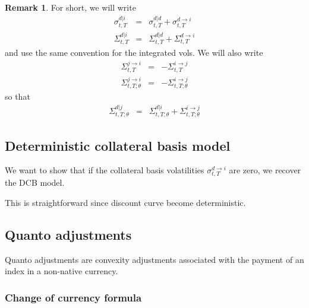 \documentclass[11pt,english]{amsart}
\theoremstyle{definition}
\newtheorem{rema}{Remark}
\begin{document}
\begin{rema}
For short, we will  write 
\begin{eqnarray}
  \sigma^{d|i}_{t,T} &=& \sigma^{d|d}_{t,T}  + \sigma^{d\to i}_{t,T} \\
  \Sigma^{d|i}_{t,T} &=& \Sigma^{d|d}_{t,T}  + \Sigma^{d\to i}_{t,T} 
\end{eqnarray} 
and use the same convention for the integrated vols. We will also write 
\begin{eqnarray}
  \Sigma^{j\to i}_{t,T} &=& - \Sigma^{i\to j}_{t,T} \\
  \Sigma^{j\to i}_{t,T;\theta} &=& - \Sigma^{i\to j}_{t,T;\theta}  
\end{eqnarray} 
so that 
\begin{eqnarray}
	\Sigma^{d|j}_{t,T;\theta} &=& \Sigma^{d|i}_{t,T;\theta}  + \Sigma^{i\to j}_{t,T;\theta}  
\end{eqnarray} 
\end{rema}



\subsection{Deterministic collateral basis model}

We want to show that if the collateral basis volatilities $\sigma^{d\to i}_{t,T}$ are zero, we recover the DCB model.   

This is straightforward since discount curve become deterministic. 


\subsection{Quanto adjustments}

Quanto adjustments are convexity adjustments associated with the payment of an index in a non-native currency.  


\subsubsection{Change of currency formula}%
 
 
\end{document}
